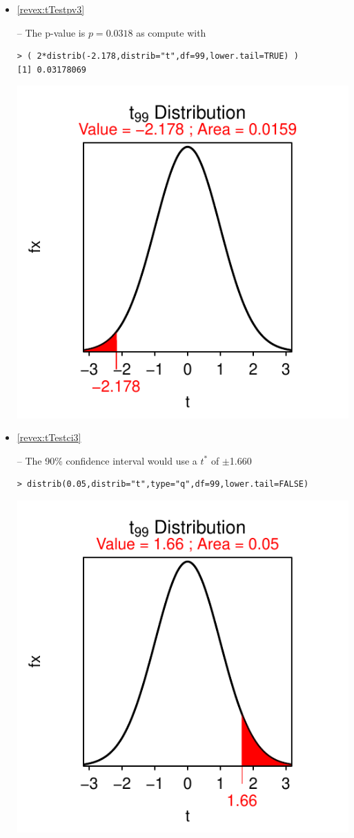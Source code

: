 \documentclass[10pt,openany]{book}\usepackage[]{graphicx}\usepackage[]{color}
\makeatletter
\newenvironment{kframe}{%
 \def\at@end@of@kframe{}%
 \ifinner\ifhmode%
  \def\at@end@of@kframe{\end{minipage}}%
  \begin{minipage}{\columnwidth}%
 \fi\fi%
 \def\FrameCommand##1{\hskip\@totalleftmargin \hskip-\fboxsep
 \colorbox{shadecolor}{##1}\hskip-\fboxsep
     \hskip-\linewidth \hskip-\@totalleftmargin \hskip\columnwidth}%
 \MakeFramed {\advance\hsize-\width
   \@totalleftmargin\z@ \linewidth\hsize
   \@setminipage}}%
 {\par\unskip\endMakeFramed%
 \at@end@of@kframe}
\newenvironment{knitrout}{}{} %
\makeatother
\begin{document}
\begin{itemize}
\begin{knitrout}
{}



\end{knitrout}
  \item \hypertarget{ans:tTestpv3}{\ref{revex:tTestpv3}} -- The p-value is $p=0.0318$ as compute with
\begin{knitrout}
\color{fgcolor}\begin{kframe}
\begin{verbatim}
> ( 2*distrib(-2.178,distrib="t",df=99,lower.tail=TRUE) )
[1] 0.03178069
\end{verbatim}
\end{kframe}

{\centering \includegraphics[width=.4\linewidth]{Figs/unnamed-chunk-358-1} 

}



\end{knitrout}
  \item \hypertarget{ans:tTestci3}{\ref{revex:tTestci3}} -- The 90\% confidence interval would use a $t^{*}$ of $\pm$1.660
\begin{knitrout}
\color{fgcolor}\begin{kframe}
\begin{verbatim}
> distrib(0.05,distrib="t",type="q",df=99,lower.tail=FALSE)
\end{verbatim}
\end{kframe}

{\centering \includegraphics[width=.4\linewidth]{Figs/unnamed-chunk-359-1} 

}
\end{knitrout}
\end{itemize}
\end{document}

